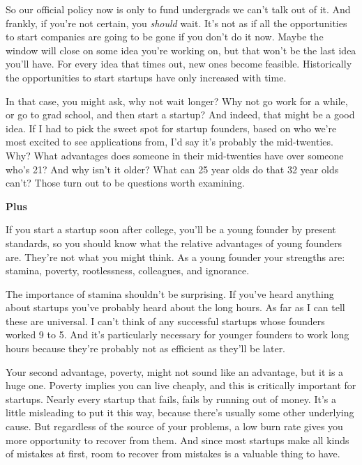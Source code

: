 So
                    our official policy now is only to fund undergrads we can't
                    talk out of it. And frankly, if you're not certain, you
                    \emph{should} wait. It's not as if all the opportunities to
                    start companies are going to be gone if you don't do it now.
                    Maybe the window will close on some idea you're working on,
                    but that won't be the last idea you'll have. For every idea
                    that times out, new ones become feasible. Historically the
                    opportunities to start startups have only increased with
                    time.

In that case, you might ask, why not wait
                    longer? Why not go work for a while, or go to grad school,
                    and then start a startup? And indeed, that might be a good
                    idea. If I had to pick the sweet spot for startup founders,
                    based on who we're most excited to see applications from,
                    I'd say it's probably the mid-twenties. Why? What advantages
                    does someone in their mid-twenties have over someone who's
                    21? And why isn't it older? What can 25 year olds do that 32
                    year olds can't? Those turn out to be questions worth
                    examining.

\textbf{Plus}

If you start a
                    startup soon after college, you'll be a young founder by
                    present standards, so you should know what the relative
                    advantages of young founders are. They're not what you might
                    think. As a young founder your strengths are: stamina,
                    poverty, rootlessness, colleagues, and ignorance.

The
                    importance of stamina shouldn't be surprising. If you've
                    heard anything about startups you've probably heard about
                    the long hours. As far as I can tell these are universal. I
                    can't think of any successful startups whose founders worked
                    9 to 5. And it's particularly necessary for younger founders
                    to work long hours because they're probably not as efficient
                    as they'll be later.

Your second advantage,
                    poverty, might not sound like an advantage, but it is a huge
                    one. Poverty implies you can live cheaply, and this is
                    critically important for startups. Nearly every startup that
                    fails, fails by running out of money. It's a little
                    misleading to put it this way, because there's usually some
                    other underlying cause. But regardless of the source of your
                    problems, a low burn rate gives you more opportunity to
                    recover from them. And since most startups make all kinds of
                    mistakes at first, room to recover from mistakes is a
                    valuable thing to have.

